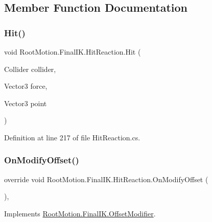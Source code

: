 \subsection{Member Function Documentation}
\mbox{\label{class_root_motion_1_1_final_i_k_1_1_hit_reaction_abc91b95d86be35379bda9f8370fec7e5}} 
\subsubsection{\texorpdfstring{Hit()}{Hit()}}
{\footnotesize\ttfamily void Root\+Motion.\+Final\+I\+K.\+Hit\+Reaction.\+Hit (\begin{DoxyParamCaption}\item[{Collider}]{collider,  }\item[{Vector3}]{force,  }\item[{Vector3}]{point }\end{DoxyParamCaption})}



Definition at line 217 of file Hit\+Reaction.\+cs.

\mbox{\label{class_root_motion_1_1_final_i_k_1_1_hit_reaction_a46076fa7f2140df3df13553cb32b27d8}} 
\subsubsection{\texorpdfstring{On\+Modify\+Offset()}{OnModifyOffset()}}
{\footnotesize\ttfamily override void Root\+Motion.\+Final\+I\+K.\+Hit\+Reaction.\+On\+Modify\+Offset (\begin{DoxyParamCaption}{ }\end{DoxyParamCaption})\hspace{0.3cm}{\ttfamily [protected]}, {\ttfamily [virtual]}}



Implements \mbox{\hyperlink{class_root_motion_1_1_final_i_k_1_1_offset_modifier_a777e9ffb4afca3d8647959a79a1120bb}{Root\+Motion.\+Final\+I\+K.\+Offset\+Modifier}}.



